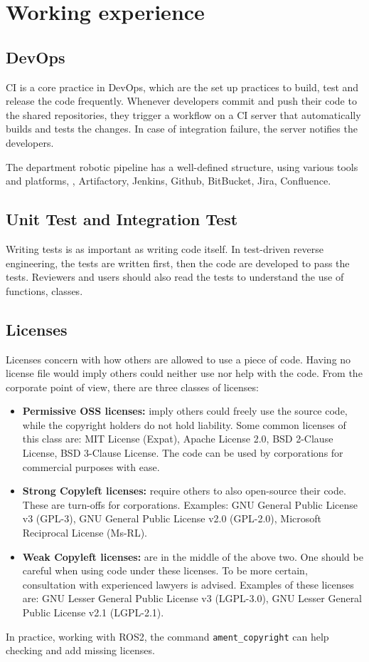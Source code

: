 \chapter{Working experience}

\section{DevOps}
\ac{CI} is a core practice in DevOps, which are the set up practices to build, test and release the code frequently. Whenever developers commit and push their code to the shared repositories, they trigger a workflow on a \ac{CI} server that automatically builds and tests the changes. In case of integration failure, the server notifies the developers.

The department robotic pipeline has a well-defined structure, using various tools and platforms, \eg, Artifactory, Jenkins, Github, BitBucket, Jira, Confluence.

\section{Unit Test and Integration Test}
Writing tests is as important as writing code itself. In test-driven reverse engineering, the tests are written first, then the code are developed to pass the tests. Reviewers and users should also read the tests to understand the use of functions, classes.

\section{Licenses}
Licenses concern with how others are allowed to use a piece of code. Having no license file would imply others could neither use nor help with the code. From the corporate point of view, there are three classes of licenses:
\begin{itemize}
	\item \textbf{Permissive OSS licenses:} imply others could freely use the source code, while the copyright holders do not hold liability. Some common licenses of this class are: MIT License (Expat), Apache License 2.0, BSD 2-Clause License, BSD 3-Clause License. The code can be used by corporations for commercial purposes with ease.
	\item \textbf{Strong Copyleft licenses: }require others to also open-source their code. These are turn-offs for corporations. Examples: GNU General Public License v3 (GPL-3), GNU General Public License v2.0 (GPL-2.0), Microsoft Reciprocal License (Ms-RL).
	\item \textbf{Weak Copyleft licenses: }are in the middle of the above two. One should be careful when using code under these licenses. To be more certain, consultation with experienced lawyers is advised. Examples of these licenses are: GNU Lesser General Public License v3 (LGPL-3.0), GNU Lesser General Public License v2.1 (LGPL-2.1).
\end{itemize}
In practice, working with ROS2, the command \verb|ament_copyright| can help checking and add missing licenses.

